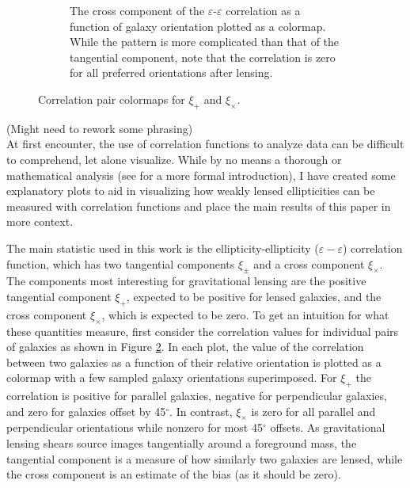 \documentclass[%
 reprint,
 amsmath,amssymb,
 aps,nofootinbib
]{revtex4-1}
\begin{document}
\begin{figure}[!b]
\begin{subfigure}{0.425\textwidth}
        \captionsetup{justification=raggedright,singlelinecheck=false}
        \caption{The cross component of the $\varepsilon$-$\varepsilon$ correlation as a function of galaxy orientation plotted as a colormap. While the pattern is more complicated than that of the tangential component, note that the correlation is zero for all preferred orientations after lensing.}
        \label{xix_colormap}
    \end{subfigure}
    \caption{Correlation pair colormaps for $\xi_+$ and $\xi_\times$.}
    \label{corr_colormaps}
\end{figure}

(Might need to rework some phrasing)\\

At first encounter, the use of correlation functions to analyze data can be difficult to comprehend, let alone visualize. While by no means a thorough or mathematical analysis (see \cite{correlation_functions} for a more formal introduction), I have created some explanatory plots to aid in visualizing how weakly lensed ellipticities can be measured with correlation functions and place the main results of this paper in more context.

The main statistic used in this work is the ellipticity-ellipticity ($\varepsilon-\varepsilon$) correlation function, which has two tangential components $\xi_\pm$ and a cross component $\xi_\times$. The components most interesting for gravitational lensing are the positive tangential component $\xi_+$, expected to be positive for lensed galaxies, and the cross component $\xi_\times$, which is expected to be zero. To get an intuition for what these quantities measure, first consider the correlation values for individual pairs of galaxies as shown in Figure \ref{corr_colormaps}. In each plot, the value of the correlation between two galaxies as a function of their relative orientation is plotted as a colormap with a few sampled galaxy orientations superimposed. For $\xi_+$ the correlation is positive for parallel galaxies, negative for perpendicular galaxies, and zero for galaxies offset by 45$^\circ$. In contrast, $\xi_\times$ is zero for all parallel and perpendicular orientations while nonzero for most 45$^\circ$ offsets. As gravitational lensing shears source images tangentially around a foreground mass, the tangential component is a measure of how similarly two galaxies are lensed, while the cross component is an estimate of the bias (as it should be zero).
\end{document}
